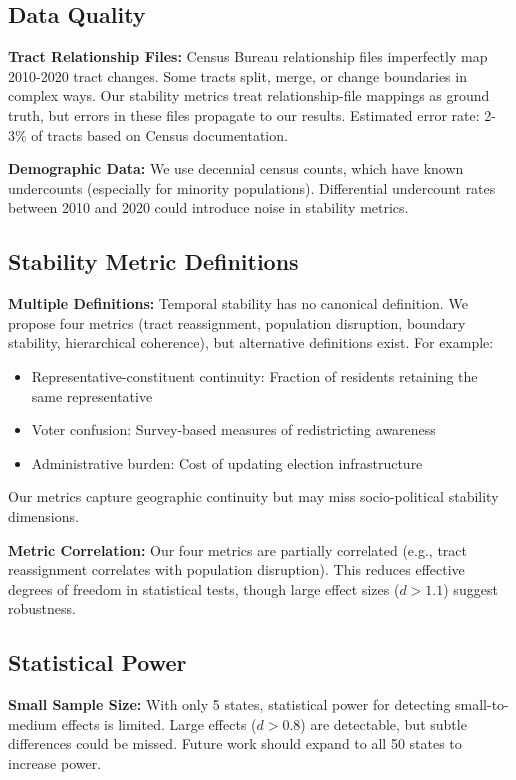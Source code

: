 \subsection{Data Quality}

\textbf{Tract Relationship Files:} Census Bureau relationship files imperfectly map 2010-2020 tract changes. Some tracts split, merge, or change boundaries in complex ways. Our stability metrics treat relationship-file mappings as ground truth, but errors in these files propagate to our results. Estimated error rate: 2-3\% of tracts based on Census documentation.

\textbf{Demographic Data:} We use decennial census counts, which have known undercounts (especially for minority populations). Differential undercount rates between 2010 and 2020 could introduce noise in stability metrics.

\subsection{Stability Metric Definitions}

\textbf{Multiple Definitions:} Temporal stability has no canonical definition. We propose four metrics (tract reassignment, population disruption, boundary stability, hierarchical coherence), but alternative definitions exist. For example:
\begin{itemize}
    \item Representative-constituent continuity: Fraction of residents retaining the same representative
    \item Voter confusion: Survey-based measures of redistricting awareness
    \item Administrative burden: Cost of updating election infrastructure
\end{itemize}

Our metrics capture geographic continuity but may miss socio-political stability dimensions.

\textbf{Metric Correlation:} Our four metrics are partially correlated (e.g., tract reassignment correlates with population disruption). This reduces effective degrees of freedom in statistical tests, though large effect sizes ($d>1.1$) suggest robustness.

\subsection{Statistical Power}

\textbf{Small Sample Size:} With only 5 states, statistical power for detecting small-to-medium effects is limited. Large effects ($d>0.8$) are detectable, but subtle differences could be missed. Future work should expand to all 50 states to increase power.

